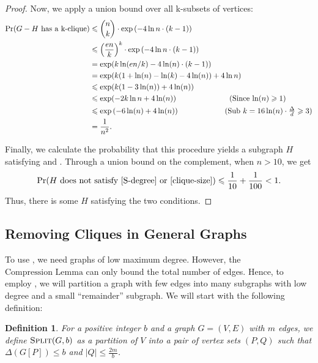 \documentclass[11pt]{article}
\newtheorem{definition}[lemma]{Definition}
\theoremstyle{definition}
\renewcommand{\leq}{\leqslant}
\renewcommand{\geq}{\geqslant}
\renewcommand{\le}{\leq}
\renewcommand{\ge}{\geq}
\DeclareMathOperator*{\Prob}{\ensuremath{\textnormal{Pr}}}
\renewcommand{\Pr}{\Prob}
\begin{document}
\begin{proof}
    Now, we apply a union bound over all k-subsets of vertices:
    \begin{align*}
        \Pr(G-H\text{ has a k-clique})&\le \binom nk\cdot \exp\left(-4\ln n\cdot (k-1)\right)\\
        &\le {\left(\frac{en}k\right)}^k \cdot \exp\left(-4\ln n\cdot (k-1)\right)\\
        &=\exp(k\ln(en/k)-4\ln(n)\cdot (k-1))\\
        &=\exp(k(1+\ln(n)-\ln(k)-4\ln(n)) + 4\ln n)\\
        &\le \exp(k(1-3\ln(n))+4\ln(n))\\
        &\le \exp(-2k\ln n + 4\ln(n))\hspace{5em}\tag{Since $\ln(n)\ge1$}\\
        &\le \exp\left(-6\ln(n)+4\ln(n)\right)\hspace{4em}\tag{Sub $k=16\ln(n)\cdot \frac{\Delta}d\ge3$}\\
        &=\frac 1{n^2}.
    \end{align*}

    Finally, we calculate the probability that this procedure yields a subgraph $H$ satisfying  and . Through a union bound on the complement, when $n>10$, we get
    \begin{align*}
        \Pr(H\text{ does not satisfy \Cref{S-degree} or \Cref{clique-size}})\le \frac1{10}+\frac1{100}<1.
    \end{align*} 
    Thus, there is some $H$ satisfying the two conditions. 
\end{proof}

\subsection{Removing Cliques in General Graphs}
\noindent
To use , we need graphs of low maximum degree. However, the $\hyperref[compression]{\text{Compression Lemma}}$ can only bound the total number of edges. Hence, to employ , we will partition a graph with few edges into many subgraphs with low degree and a small ``remainder'' subgraph. We will start with the following definition:

\newcommand{\graphSplit}{\textnormal{\textsc{Split}}}

\begin{definition}
    For a positive integer $b$ and a graph $G=(V, E)$ with $m$ edges, we define $\graphSplit(G, b)$ as a partition of $V$ into a pair of vertex sets $(P, Q)$ such that $\Delta{(G[P])}\le b$ and $|Q|\le \frac{2m}b$.
\end{definition}
\end{document}
